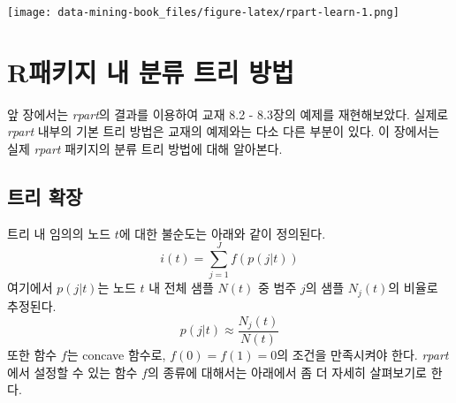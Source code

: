 \documentclass[
]{book}
\newenvironment{Shaded}{\begin{snugshade}}{\end{snugshade}}
\newcommand{\AttributeTok}[1]{\textcolor[rgb]{0.77,0.63,0.00}{#1}}
\newcommand{\CommentTok}[1]{\textcolor[rgb]{0.56,0.35,0.01}{\textit{#1}}}
\newcommand{\ControlFlowTok}[1]{\textcolor[rgb]{0.13,0.29,0.53}{\textbf{#1}}}
\newcommand{\DecValTok}[1]{\textcolor[rgb]{0.00,0.00,0.81}{#1}}
\newcommand{\FunctionTok}[1]{\textcolor[rgb]{0.00,0.00,0.00}{#1}}
\newcommand{\NormalTok}[1]{#1}
\newcommand{\OtherTok}[1]{\textcolor[rgb]{0.56,0.35,0.01}{#1}}
\newcommand{\SpecialCharTok}[1]{\textcolor[rgb]{0.00,0.00,0.00}{#1}}
\newcommand{\StringTok}[1]{\textcolor[rgb]{0.31,0.60,0.02}{#1}}
\begin{document}
\begin{Shaded}
\end{Shaded}

\texttt{[image: data-mining-book\_files/figure-latex/rpart-learn-1.png]}

\hypertarget{cart-r-pkg}{%
\section{R패키지 내 분류 트리 방법}\label{cart-r-pkg}}

앞 장에서는 \emph{rpart}의 결과를 이용하여 교재 8.2 - 8.3장의 예제를 재현해보았다. 실제로 \emph{rpart} 내부의 기본 트리 방법은 교재의 예제와는 다소 다른 부분이 있다. 이 장에서는 실제 \emph{rpart} 패키지의 분류 트리 방법에 대해 알아본다.

\hypertarget{cart-r-pkg-split}{%
\subsection{트리 확장}\label{cart-r-pkg-split}}

트리 내 임의의 노드 \(t\)에 대한 불순도는 아래와 같이 정의된다.
\[i(t) = \sum_{j=1}^{J} f\left(p(j|t)\right)\]
여기에서 \(p(j|t)\)는 노드 \(t\) 내 전체 샘플 \(N(t)\) 중 범주 \(j\)의 샘플 \(N_j(t)\)의 비율로 추정된다.
\[p(j|t) \approx \frac{N_j(t)}{N(t)}\]
또한 함수 \(f\)는 concave 함수로, \(f(0) = f(1) = 0\)의 조건을 만족시켜야 한다. \emph{rpart} 에서 설정할 수 있는 함수 \(f\)의 종류에 대해서는 아래에서 좀 더 자세히 살펴보기로 한다.
\end{document}
